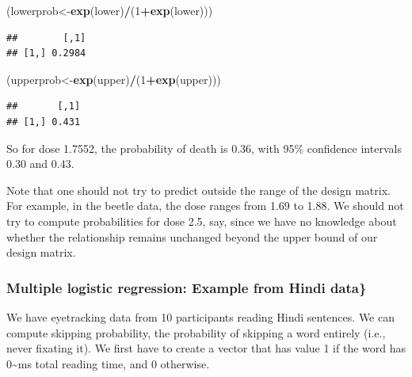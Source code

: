 \documentclass[12pt,]{krantz}
\newenvironment{Shaded}{\begin{snugshade}}{\end{snugshade}}
\newcommand{\DecValTok}[1]{\textcolor[rgb]{0.00,0.00,0.81}{#1}}
\newcommand{\KeywordTok}[1]{\textcolor[rgb]{0.13,0.29,0.53}{\textbf{#1}}}
\newcommand{\NormalTok}[1]{#1}
\newcommand{\OperatorTok}[1]{\textcolor[rgb]{0.81,0.36,0.00}{\textbf{#1}}}
\begin{document}
\begin{Shaded}
\begin{Highlighting}[]
\NormalTok{(lowerprob<-}\KeywordTok{exp}\NormalTok{(lower)}\OperatorTok{/}\NormalTok{(}\DecValTok{1}\OperatorTok{+}\KeywordTok{exp}\NormalTok{(lower)))}
\end{Highlighting}
\end{Shaded}

\begin{verbatim}
##        [,1]
## [1,] 0.2984
\end{verbatim}

\begin{Shaded}
\begin{Highlighting}[]
\NormalTok{(upperprob<-}\KeywordTok{exp}\NormalTok{(upper)}\OperatorTok{/}\NormalTok{(}\DecValTok{1}\OperatorTok{+}\KeywordTok{exp}\NormalTok{(upper)))}
\end{Highlighting}
\end{Shaded}

\begin{verbatim}
##       [,1]
## [1,] 0.431
\end{verbatim}

So for dose 1.7552, the probability of death is 0.36,
with 95\% confidence intervals 0.30 and
0.43.

Note that one should not try to predict outside the range of the design matrix. For example, in the beetle data, the dose ranges from 1.69 to 1.88. We should not try to compute probabilities for dose 2.5, say, since we have no knowledge about whether the relationship remains unchanged beyond the upper bound of our design matrix.

\hypertarget{multiple-logistic-regression-example-from-hindi-data}{%
\subsubsection{Multiple logistic regression: Example from Hindi data\}}\label{multiple-logistic-regression-example-from-hindi-data}}

We have eyetracking data from 10 participants reading Hindi sentences. We can compute skipping probability, the probability of skipping a word entirely (i.e., never fixating it). We first have to create a vector that has value 1 if the word has 0\textasciitilde{}ms total reading time, and 0 otherwise.
\end{document}

